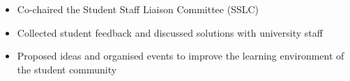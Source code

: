 \documentclass{resume}
\begin{document}


\begin{itemize}
  \item Co-chaired the Student Staff Liaison Committee (SSLC)
  \item Collected student feedback and discussed solutions with university staff
  \item Proposed ideas and organised events to improve the learning environment of the student community
\end{itemize}



\end{document}
